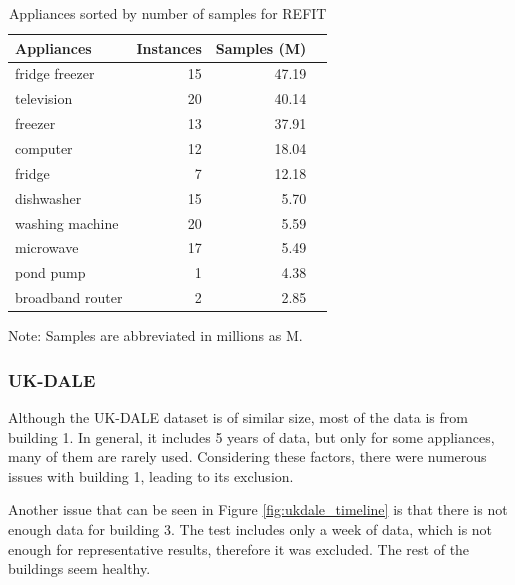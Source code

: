 \begin{table}[H]
    \centering
    \caption{Appliances sorted by number of samples for REFIT}
    \label{tab:refit_table}
    \begin{tabular}{@{}lrrr@{}}
        \toprule
        \textbf{Appliances} & \textbf{Instances}  & \textbf{Samples (M)} \\
        \midrule
        fridge freezer      & 15           & 47.19                \\
        television          & 20           & 40.14                \\
        freezer             & 13           & 37.91                \\
        computer            & 12           & 18.04                \\
        fridge              & 7            & 12.18                \\
        dishwasher          & 15           & 5.70                 \\
        washing machine     & 20           & 5.59                 \\
        microwave           & 17           & 5.49                 \\
        pond pump           & 1            & 4.38                 \\
        broadband router    & 2            & 2.85                 \\
        \bottomrule
    \end{tabular}
    \par\smallskip
    \footnotesize{Note: Samples are abbreviated in millions as M.}
\end{table}


\subsubsection{UK-DALE} 

Although the UK-DALE \cite{UKDALE} dataset is of similar size, most of the data is from building 1.
In general, it includes 5 years of data, but only for some appliances, many of them are rarely used.
Considering these factors, there were numerous issues with building 1, leading to its exclusion.

Another issue that can be seen in Figure \ref{fig:ukdale_timeline} is that there is not enough data for building 3. 
The test includes only a week of data, which is not enough for representative results, therefore it was excluded.
The rest of the buildings seem healthy.

